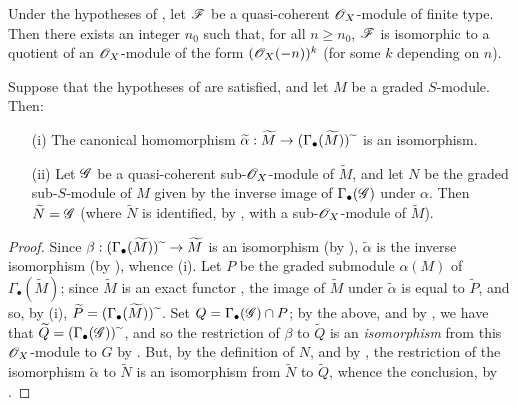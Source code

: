 \begin{corollary}[2.7.10]
\label{II.2.7.10}
Under the hypotheses of , let $\mathscr{F}$ be a quasi-coherent $\mathscr{O}_X$-module of finite type.
Then there exists an integer $n_0$ such that, for all $n\geq n_0$, $\mathscr{F}$ is isomorphic to a quotient of an $\mathscr{O}_X$-module of the form $(\mathscr{O}_X(-n))^k$ (for some $k$ depending on $n$).
\end{corollary}

\begin{proposition}[2.7.11]
\label{II.2.7.11}
Suppose that the hypotheses of  are satisfied, and let $M$ be a graded $S$-module.
Then:
\begin{enumerate}
  \item[{\rm(i)}] The canonical homomorphism $\widetilde{\alpha}:\widetilde{M}\to(\Gamma_\bullet(\widetilde{M}))\supertilde$ is an isomorphism.
  \item[{\rm(ii)}] Let $\mathscr{G}$ be a quasi-coherent sub-$\mathscr{O}_X$-module of $\widetilde{M}$, and let $N$ be the graded sub-$S$-module of $M$ given by the  inverse image of $\Gamma_\bullet(\mathscr{G})$ under $\alpha$.
    Then $\widetilde{N}=\mathscr{G}$ (where $\widetilde{N}$ is identified, by , with a sub-$\mathscr{O}_X$-module of $\widetilde{M}$).
\end{enumerate}
\end{proposition}

\begin{proof}
Since $\beta:(\Gamma_\bullet(\widetilde{M}))\supertilde\to\widetilde{M}$ is an isomorphism (by ), $\widetilde{\alpha}$ is the inverse isomorphism (by ), whence (i).
Let $P$ be the graded submodule $\alpha(M)$ of $\Gamma_\bullet(\widetilde{M})$;
since $\widetilde{M}$ is an exact functor , the image of $\widetilde{M}$ under $\widetilde{\alpha}$ is equal to $\widetilde{P}$, and so, by (i), $\widetilde{P}=(\Gamma_\bullet(\widetilde{M})){\,\widetilde{\,}\,}$.
Set $Q=\Gamma_\bullet(\mathscr{G})\cap P$;
by the above, and by , we have that $\widetilde{Q}=(\Gamma_\bullet(\mathscr{G})){\,\widetilde{\,}\,}$, and so the restriction of $\beta$ to $\widetilde{Q}$ is an \emph{isomorphism} from this $\mathscr{O}_X$-module to $G$ by .
But, by the definition of $N$, and by , the restriction of the isomorphism $\widetilde{\alpha}$ to $\widetilde{N}$ is an isomorphism from $\widetilde{N}$ to $\widetilde{Q}$, whence the conclusion, by .
\end{proof}


